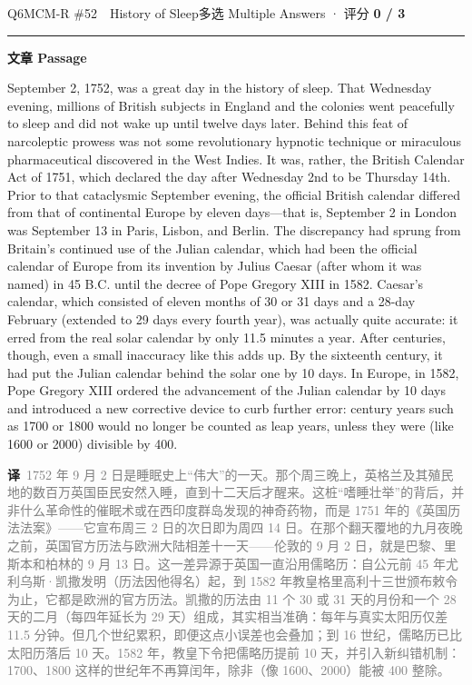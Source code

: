 \documentclass[11pt]{article}
\newcommand{\ptesub}[1]{%
  \par\needspace{2\baselineskip}\smallskip
  {\color{cAccent}\rule[-0.2ex]{3pt}{1.05em}}\hspace{6pt}%
  {\bfseries\color{cHead}#1}\par\nopagebreak\smallskip}
\newcommand{\zh}[1]{{\footnotesize\textcolor{cNote}{\textbf{译}}\ \textcolor{gray}{#1}}}
\begin{document}
\begin{qblock}{Q6\quad MCM-R \#52\ \ History of Sleep}{多选 Multiple Answers · 评分 \textcolor{cAccent}{\bfseries 0 / 3}}
\ptesub{文章 Passage}
\begin{promptbox}
September 2, 1752, was a great day in the history of sleep. That Wednesday evening, millions of British subjects in England and the colonies went peacefully to sleep and did not wake up until twelve days later. Behind this feat of narcoleptic prowess was not some revolutionary hypnotic technique or miraculous pharmaceutical discovered in the West Indies. It was, rather, the British Calendar Act of 1751, which declared the day after Wednesday 2nd to be Thursday 14th. Prior to that cataclysmic September evening, the official British calendar differed from that of continental Europe by eleven days---that is, September 2 in London was September 13 in Paris, Lisbon, and Berlin. The discrepancy had sprung from Britain's continued use of the Julian calendar, which had been the official calendar of Europe from its invention by Julius Caesar (after whom it was named) in 45 B.C. until the decree of Pope Gregory XIII in 1582. Caesar's calendar, which consisted of eleven months of 30 or 31 days and a 28-day February (extended to 29 days every fourth year), was actually quite accurate: it erred from the real solar calendar by only 11.5 minutes a year. After centuries, though, even a small inaccuracy like this adds up. By the sixteenth century, it had put the Julian calendar behind the solar one by 10 days. In Europe, in 1582, Pope Gregory XIII ordered the advancement of the Julian calendar by 10 days and introduced a new corrective device to curb further error: century years such as 1700 or 1800 would no longer be counted as leap years, unless they were (like 1600 or 2000) divisible by 400.
\end{promptbox}
\zh{1752 年 9 月 2 日是睡眠史上“伟大”的一天。那个周三晚上，英格兰及其殖民地的数百万英国臣民安然入睡，直到十二天后才醒来。这桩“嗜睡壮举”的背后，并非什么革命性的催眠术或在西印度群岛发现的神奇药物，而是 1751 年的《英国历法法案》——它宣布周三 2 日的次日即为周四 14 日。在那个翻天覆地的九月夜晚之前，英国官方历法与欧洲大陆相差十一天——伦敦的 9 月 2 日，就是巴黎、里斯本和柏林的 9 月 13 日。这一差异源于英国一直沿用儒略历：自公元前 45 年尤利乌斯·凯撒发明（历法因他得名）起，到 1582 年教皇格里高利十三世颁布敕令为止，它都是欧洲的官方历法。凯撒的历法由 11 个 30 或 31 天的月份和一个 28 天的二月（每四年延长为 29 天）组成，其实相当准确：每年与真实太阳历仅差 11.5 分钟。但几个世纪累积，即便这点小误差也会叠加；到 16 世纪，儒略历已比太阳历落后 10 天。1582 年，教皇下令把儒略历提前 10 天，并引入新纠错机制：1700、1800 这样的世纪年不再算闰年，除非（像 1600、2000）能被 400 整除。}

\end{qblock}
\end{document}
